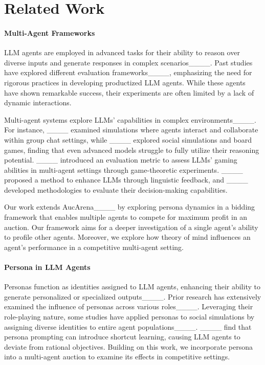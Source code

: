 \section{Related Work}
\label{sec:related}

\paragraph{Multi-Agent Frameworks}\;
LLM agents are employed in advanced tasks for their ability to reason over diverse inputs and generate responses in complex scenarios____. Past studies have explored different evaluation frameworks____, emphasizing the need for rigorous practices in developing productized LLM agents. While these agents have shown remarkable success, their experiments are often limited by a lack of dynamic interactions.

Multi-agent systems explore LLMs' capabilities in complex environments____. For instance, ____ examined simulations where agents interact and collaborate within group chat settings, while ____ explored social simulations and board games, finding that even advanced models struggle to fully utilize their reasoning potential. ____ introduced an evaluation metric to assess LLMs' gaming abilities in multi-agent settings through game-theoretic experiments. ____ proposed a method to enhance LLMs through linguistic feedback, and ____ developed methodologies to evaluate their decision-making capabilities.

Our work extends AucArena____ by exploring persona dynamics in a bidding framework that enables multiple agents to compete for maximum profit in an auction. Our framework aims for a deeper investigation of a single agent's ability to profile other agents. Moreover, we explore how theory of mind influences an agent's performance in a competitive multi-agent setting.

\vspace{-0.05in}
\paragraph{Persona in LLM Agents}\;
Personas function as identities assigned to LLM agents, enhancing their ability to generate personalized or specialized outputs____. Prior research has extensively examined the influence of personas across various roles____. Leveraging their role-playing nature, some studies have applied personas to social simulations by assigning diverse identities to entire agent populations____. ____ find that persona prompting can introduce shortcut learning, causing LLM agents to deviate from rational objectives.  
Building on this work, we incorporate persona into a multi-agent auction to examine its effects in competitive settings.

